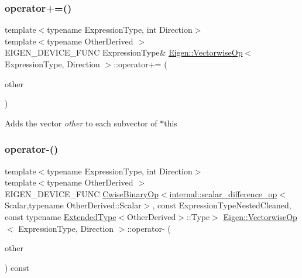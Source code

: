 \subsubsection{\texorpdfstring{operator+=()}{operator+=()}}
{\footnotesize\ttfamily template$<$typename Expression\+Type, int Direction$>$ \\
template$<$typename Other\+Derived $>$ \\
E\+I\+G\+E\+N\+\_\+\+D\+E\+V\+I\+C\+E\+\_\+\+F\+U\+NC Expression\+Type\& \mbox{\hyperlink{class_eigen_1_1_vectorwise_op}{Eigen\+::\+Vectorwise\+Op}}$<$ Expression\+Type, Direction $>$\+::operator+= (\begin{DoxyParamCaption}\item[{const \mbox{\hyperlink{class_eigen_1_1_dense_base}{Dense\+Base}}$<$ Other\+Derived $>$ \&}]{other }\end{DoxyParamCaption})\hspace{0.3cm}{\ttfamily [inline]}}

Adds the vector {\itshape other} to each subvector of {\ttfamily $\ast$this} \mbox{\label{class_eigen_1_1_vectorwise_op_a5aced68defd8d0fd08829386b6c285fb}} 
\subsubsection{\texorpdfstring{operator-\/()}{operator-()}}
{\footnotesize\ttfamily template$<$typename Expression\+Type, int Direction$>$ \\
template$<$typename Other\+Derived $>$ \\
E\+I\+G\+E\+N\+\_\+\+D\+E\+V\+I\+C\+E\+\_\+\+F\+U\+NC \mbox{\hyperlink{class_eigen_1_1_cwise_binary_op}{Cwise\+Binary\+Op}}$<$\mbox{\hyperlink{struct_eigen_1_1internal_1_1scalar__difference__op}{internal\+::scalar\+\_\+difference\+\_\+op}}$<$Scalar,typename Other\+Derived\+::\+Scalar$>$, const Expression\+Type\+Nested\+Cleaned, const typename \mbox{\hyperlink{struct_eigen_1_1_vectorwise_op_1_1_extended_type}{Extended\+Type}}$<$Other\+Derived$>$\+::Type$>$ \mbox{\hyperlink{class_eigen_1_1_vectorwise_op}{Eigen\+::\+Vectorwise\+Op}}$<$ Expression\+Type, Direction $>$\+::operator-\/ (\begin{DoxyParamCaption}\item[{const \mbox{\hyperlink{class_eigen_1_1_dense_base}{Dense\+Base}}$<$ Other\+Derived $>$ \&}]{other }\end{DoxyParamCaption}) const\hspace{0.3cm}{\ttfamily [inline]}}

